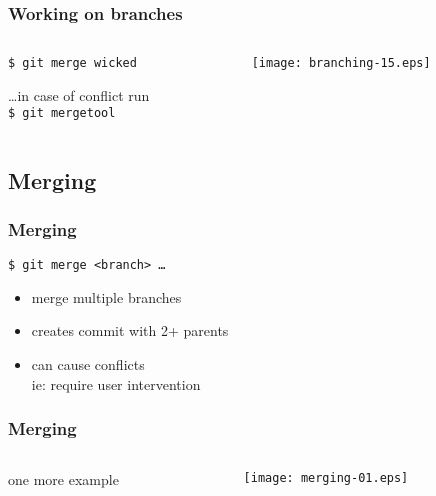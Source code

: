 \documentclass[english]{beamer}
\newcommand{\mysubsection}[2]{%
  \hypertarget{#2}{}%
  \subsection{#1}%
  \label{#2}%
}
\newcommand{\CMD}[1]{%
\texttt{\textcolor{code-green}{#1}}%
}
\newcommand{\faint}[1]{%
\textcolor{code-gray}{#1}%
}
\newcommand{\red}[1]{%
\textcolor{code-red}{#1}%
}
\begin{document}
\begin{frame}
\frametitle{Working on branches}

\begin{columns}[t]
        \begin{column}[T]{.5\textwidth}
                {\small
                \CMD{\$ git merge wicked} \\

                \pause{}
                \vspace{\baselineskip}

                \faint{\ldots in case of conflict run} \\

                \CMD{\$ git mergetool} \\
                }
        \end{column}
        \begin{column}[T]{.5\textwidth}
                \texttt{[image: branching-15.eps]}
        \end{column}
\end{columns}
\end{frame}

\mysubsection{Merging}{using:merging}
\begin{frame}
\frametitle{Merging}

\CMD{\$ git merge <branch> \ldots} \\
\begin{itemize}
        \item merge multiple branches
        \item creates commit with 2+ parents
        \item can cause \red{conflicts} \\
                \faint{ie: require user intervention}
\end{itemize}
\end{frame}

\begin{frame}
\frametitle{Merging}

\begin{columns}[t]
        \begin{column}[T]{.5\textwidth}
                one more example
        \end{column}
        \begin{column}[T]{.5\textwidth}
                \texttt{[image: merging-01.eps]}
        \end{column}
\end{columns}
\end{frame}
\end{document}
